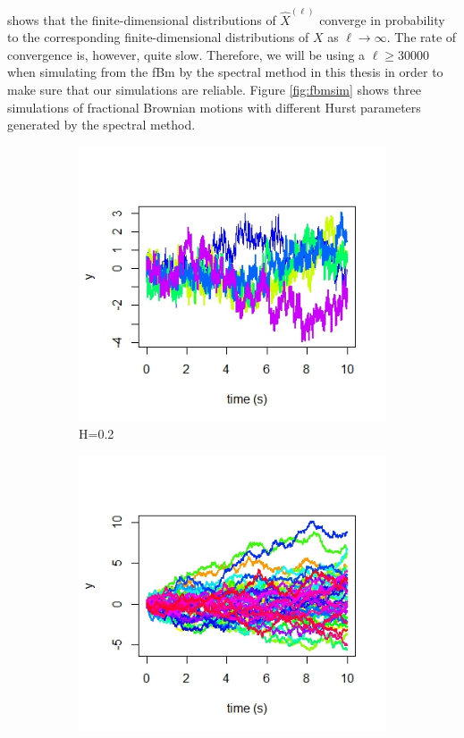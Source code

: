 \documentclass{article}
\begin{document}
\cite{dieker} shows that the finite-dimensional distributions of $\hat{X}^{(\ell)}$ converge in probability to the corresponding finite-dimensional distributions of $X$ as $\ell\rightarrow \infty$. The rate of convergence is, however, quite slow. Therefore, we will be using a $\ell \geq 30000$ when simulating from the fBm by the spectral method in this thesis in order to make sure that our simulations are reliable. Figure \ref{fig:fbmsim} shows three simulations of fractional Brownian motions with different Hurst parameters generated by the spectral method. 
\begin{figure}[h]
    \centering
    \begin{subfigure}{0.32\textwidth}
        \centering
        \includegraphics[width=\textwidth]{specsim1.jpeg}
        \caption{H=0.2}
    \end{subfigure}\hfill
    \begin{subfigure}{0.32\textwidth}
        \centering
        \includegraphics[width=\textwidth]{specsim2.jpeg}

\end{subfigure}
\end{figure}
\end{document}
